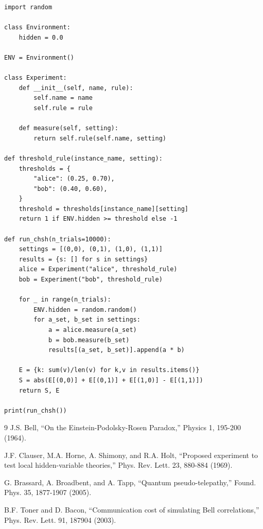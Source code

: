 \documentclass[11pt,a4paper]{article}
\begin{document}
\begin{verbatim}
import random

class Environment:
    hidden = 0.0

ENV = Environment()

class Experiment:
    def __init__(self, name, rule):
        self.name = name
        self.rule = rule

    def measure(self, setting):
        return self.rule(self.name, setting)

def threshold_rule(instance_name, setting):
    thresholds = {
        "alice": (0.25, 0.70),
        "bob": (0.40, 0.60),
    }
    threshold = thresholds[instance_name][setting]
    return 1 if ENV.hidden >= threshold else -1

def run_chsh(n_trials=10000):
    settings = [(0,0), (0,1), (1,0), (1,1)]
    results = {s: [] for s in settings}
    alice = Experiment("alice", threshold_rule)
    bob = Experiment("bob", threshold_rule)

    for _ in range(n_trials):
        ENV.hidden = random.random()
        for a_set, b_set in settings:
            a = alice.measure(a_set)
            b = bob.measure(b_set)
            results[(a_set, b_set)].append(a * b)

    E = {k: sum(v)/len(v) for k,v in results.items()}
    S = abs(E[(0,0)] + E[(0,1)] + E[(1,0)] - E[(1,1)])
    return S, E

print(run_chsh())
\end{verbatim}

\begin{thebibliography}{9}
J.S. Bell, ``On the Einstein-Podolsky-Rosen Paradox,'' Physics 1, 195-200 (1964).

J.F. Clauser, M.A. Horne, A. Shimony, and R.A. Holt, ``Proposed experiment to test local hidden-variable theories,'' Phys. Rev. Lett. 23, 880-884 (1969).

G. Brassard, A. Broadbent, and A. Tapp, ``Quantum pseudo-telepathy,'' Found. Phys. 35, 1877-1907 (2005).

B.F. Toner and D. Bacon, ``Communication cost of simulating Bell correlations,'' Phys. Rev. Lett. 91, 187904 (2003).
\end{thebibliography}
\end{document}
